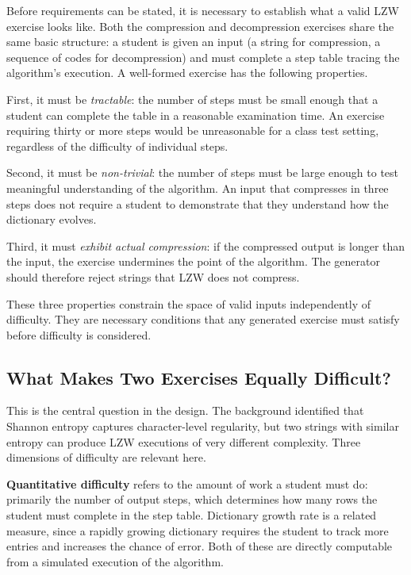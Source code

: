 \documentclass{l4proj}
\begin{document}
Before requirements can be stated, it is necessary to establish what a valid LZW exercise looks like. Both the compression and decompression exercises share the same basic structure: a student is given an input (a string for compression, a sequence of codes for decompression) and must complete a step table tracing the algorithm's execution. A well-formed exercise has the following properties.

First, it must be \emph{tractable}: the number of steps must be small enough that a student can complete the table in a reasonable examination time. An exercise requiring thirty or more steps would be unreasonable for a class test setting, regardless of the difficulty of individual steps.

Second, it must be \emph{non-trivial}: the number of steps must be large enough to test meaningful understanding of the algorithm. An input that compresses in three steps does not require a student to demonstrate that they understand how the dictionary evolves.

Third, it must \emph{exhibit actual compression}: if the compressed output is longer than the input, the exercise undermines the point of the algorithm. The generator should therefore reject strings that LZW does not compress.

These three properties constrain the space of valid inputs independently of difficulty. They are necessary conditions that any generated exercise must satisfy before difficulty is considered.

\subsection{What Makes Two Exercises Equally Difficult?}

This is the central question in the design. The background identified that Shannon entropy captures character-level regularity, but two strings with similar entropy can produce LZW executions of very different complexity. Three dimensions of difficulty are relevant here.

\textbf{Quantitative difficulty} refers to the amount of work a student must do: primarily the number of output steps, which determines how many rows the student must complete in the step table. Dictionary growth rate is a related measure, since a rapidly growing dictionary requires the student to track more entries and increases the chance of error. Both of these are directly computable from a simulated execution of the algorithm.
\end{document}
